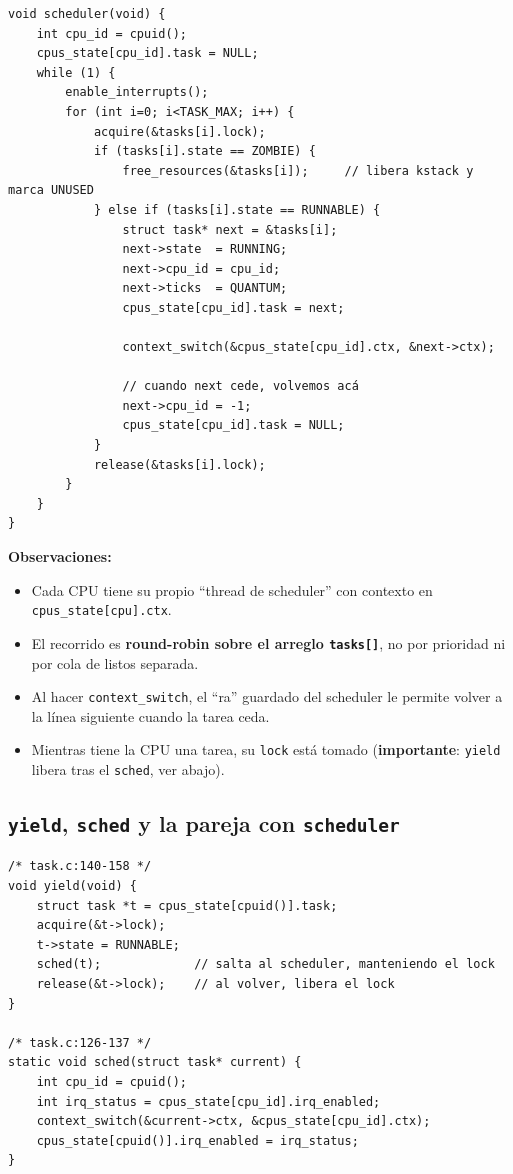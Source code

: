 \documentclass[11pt,a4paper]{article}
\begin{document}
\begin{walkthrough}
\begin{lstlisting}[style=cstyle]
void scheduler(void) {
    int cpu_id = cpuid();
    cpus_state[cpu_id].task = NULL;
    while (1) {
        enable_interrupts();
        for (int i=0; i<TASK_MAX; i++) {
            acquire(&tasks[i].lock);
            if (tasks[i].state == ZOMBIE) {
                free_resources(&tasks[i]);     // libera kstack y marca UNUSED
            } else if (tasks[i].state == RUNNABLE) {
                struct task* next = &tasks[i];
                next->state  = RUNNING;
                next->cpu_id = cpu_id;
                next->ticks  = QUANTUM;
                cpus_state[cpu_id].task = next;

                context_switch(&cpus_state[cpu_id].ctx, &next->ctx);

                // cuando next cede, volvemos acá
                next->cpu_id = -1;
                cpus_state[cpu_id].task = NULL;
            }
            release(&tasks[i].lock);
        }
    }
}
\end{lstlisting}

\textbf{Observaciones:}

\begin{itemize}[leftmargin=*,nosep]
    \item Cada CPU tiene su propio ``thread de scheduler'' con
        contexto en \texttt{cpus\_state[cpu].ctx}.
    \item El recorrido es \textbf{round-robin sobre el arreglo
        \texttt{tasks[]}}, no por prioridad ni por cola de listos
        separada.
    \item Al hacer \texttt{context\_switch}, el ``ra'' guardado del
        scheduler le permite volver a la línea siguiente cuando la
        tarea ceda.
    \item Mientras tiene la CPU una tarea, su \texttt{lock} está
        tomado (\textbf{importante}: \texttt{yield} libera tras el
        \texttt{sched}, ver abajo).
\end{itemize}
\end{walkthrough}

\subsection*{\texttt{yield}, \texttt{sched} y la pareja con \texttt{scheduler}}

\begin{lstlisting}[style=cstyle]
/* task.c:140-158 */
void yield(void) {
    struct task *t = cpus_state[cpuid()].task;
    acquire(&t->lock);
    t->state = RUNNABLE;
    sched(t);             // salta al scheduler, manteniendo el lock
    release(&t->lock);    // al volver, libera el lock
}

/* task.c:126-137 */
static void sched(struct task* current) {
    int cpu_id = cpuid();
    int irq_status = cpus_state[cpu_id].irq_enabled;
    context_switch(&current->ctx, &cpus_state[cpu_id].ctx);
    cpus_state[cpuid()].irq_enabled = irq_status;
}
\end{lstlisting}
\end{document}
